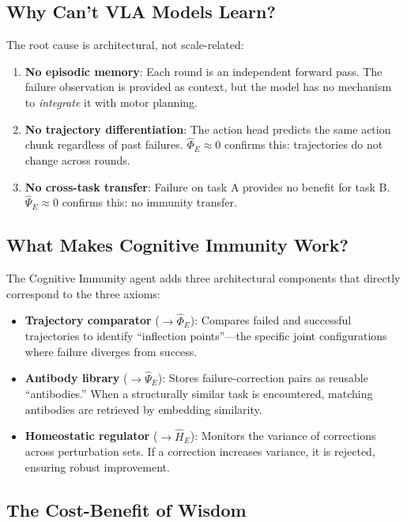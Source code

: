 ﻿\documentclass{article}
\begin{document}
\subsection{Why Can't VLA Models Learn?}

The root cause is architectural, not scale-related:

\begin{enumerate}[leftmargin=*,itemsep=2pt]
    \item \textbf{No episodic memory}: Each round is an independent forward pass. The failure observation is provided as context, but the model has no mechanism to \emph{integrate} it with motor planning.
    \item \textbf{No trajectory differentiation}: The action head predicts the same action chunk regardless of past failures. $\hat{\Phi}_E \approx 0$ confirms this: trajectories do not change across rounds.
    \item \textbf{No cross-task transfer}: Failure on task A provides no benefit for task B. $\hat{\Psi}_E \approx 0$ confirms this: no immunity transfer.
\end{enumerate}

\subsection{What Makes Cognitive Immunity Work?}

The Cognitive Immunity agent adds three architectural components that directly correspond to the three axioms:

\begin{itemize}[leftmargin=*,itemsep=2pt]
    \item \textbf{Trajectory comparator} ($\to \hat{\Phi}_E$): Compares failed and successful trajectories to identify ``inflection points''---the specific joint configurations where failure diverges from success.
    \item \textbf{Antibody library} ($\to \hat{\Psi}_E$): Stores failure-correction pairs as reusable ``antibodies.'' When a structurally similar task is encountered, matching antibodies are retrieved by embedding similarity.
    \item \textbf{Homeostatic regulator} ($\to \hat{H}_E$): Monitors the variance of corrections across perturbation sets. If a correction increases variance, it is rejected, ensuring robust improvement.
\end{itemize}

\subsection{The Cost-Benefit of Wisdom}
\end{document}
